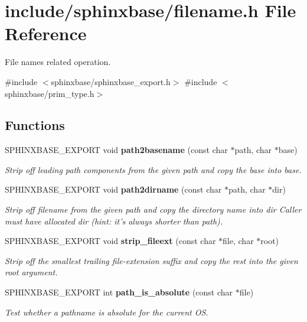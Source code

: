 \section{include/sphinxbase/filename.h \-File \-Reference}
\label{filename_8h}


\-File names related operation.  


{\ttfamily \#include $<$sphinxbase/sphinxbase\-\_\-export.\-h$>$}\*
{\ttfamily \#include $<$sphinxbase/prim\-\_\-type.\-h$>$}\*
\subsection*{\-Functions}
\begin{DoxyCompactItemize}
\item 
\-S\-P\-H\-I\-N\-X\-B\-A\-S\-E\-\_\-\-E\-X\-P\-O\-R\-T void {\bf path2basename} (const char $\ast$path, char $\ast$base)
\begin{DoxyCompactList}\small\item\em \-Strip off leading path components from the given path and copy the base into base. \end{DoxyCompactList}\item 
\-S\-P\-H\-I\-N\-X\-B\-A\-S\-E\-\_\-\-E\-X\-P\-O\-R\-T void {\bf path2dirname} (const char $\ast$path, char $\ast$dir)\label{filename_8h_a678be92ddb74695f26a9e4f527b073b0}

\begin{DoxyCompactList}\small\item\em \-Strip off filename from the given path and copy the directory name into dir \-Caller must have allocated dir (hint\-: it's always shorter than path). \end{DoxyCompactList}\item 
\-S\-P\-H\-I\-N\-X\-B\-A\-S\-E\-\_\-\-E\-X\-P\-O\-R\-T void {\bf strip\-\_\-fileext} (const char $\ast$file, char $\ast$root)
\begin{DoxyCompactList}\small\item\em \-Strip off the smallest trailing file-\/extension suffix and copy the rest into the given root argument. \end{DoxyCompactList}\item 
\-S\-P\-H\-I\-N\-X\-B\-A\-S\-E\-\_\-\-E\-X\-P\-O\-R\-T int {\bf path\-\_\-is\-\_\-absolute} (const char $\ast$file)\label{filename_8h_ac59add2db73b33e81b354de114268e7a}

\begin{DoxyCompactList}\small\item\em \-Test whether a pathname is absolute for the current \-O\-S. \end{DoxyCompactList}\end{DoxyCompactItemize}


